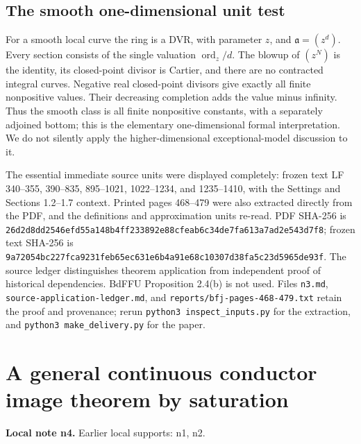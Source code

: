\documentclass[11pt]{article}
\begin{document}
\subsection{The smooth one-dimensional unit test}

For a smooth local curve the ring is a DVR, with parameter $z$, and $\mathfrak a=(z^d)$. Every section consists of the single valuation $\operatorname{ord}_z/d$. The blowup of $(z^N)$ is the identity, its closed-point divisor is Cartier, and there are no contracted integral curves. Negative real closed-point divisors give exactly all finite nonpositive values. Their decreasing completion adds the value minus infinity. Thus the smooth class is all finite nonpositive constants, with a separately adjoined bottom; this is the elementary one-dimensional formal interpretation. We do not silently apply the higher-dimensional exceptional-model discussion to it.

The essential immediate source units were displayed completely: frozen text LF 340--355, 390--835, 895--1021, 1022--1234, and 1235--1410, with the Settings and Sections 1.2--1.7 context. Printed pages 468--479 were also extracted directly from the PDF, and the definitions and approximation units re-read. PDF SHA-256 is \texttt{26d2d8dd\allowbreak{}2546efd5\allowbreak{}5a148b4f\allowbreak{}f233892e\allowbreak{}88cfeab6\allowbreak{}c34de7fa\allowbreak{}613a7ad2\allowbreak{}e543d7f8}; frozen text SHA-256 is \texttt{9a72054b\allowbreak{}c227fca9\allowbreak{}231feb65\allowbreak{}ec631e6b\allowbreak{}4a91e68c\allowbreak{}10307d38\allowbreak{}fa5c23d5\allowbreak{}965de93f}. The source ledger distinguishes theorem application from independent proof of historical dependencies. BdFFU Proposition 2.4(b) is not used. Files \texttt{n3.\allowbreak{}md}, \texttt{source-\allowbreak{}application-\allowbreak{}ledger.\allowbreak{}md}, and \texttt{reports/\allowbreak{}bfj-\allowbreak{}pages-\allowbreak{}468-\allowbreak{}479.\allowbreak{}txt} retain the proof and provenance; rerun \texttt{python3 inspect\_\allowbreak{}inputs.\allowbreak{}py} for the extraction, and \texttt{python3 make\_\allowbreak{}delivery.\allowbreak{}py} for the paper.

\section{A general continuous conductor image theorem by saturation}
\label{sec:n4}
\noindent\textbf{Local note n4.} Earlier local supports: n1, n2.
\end{document}
